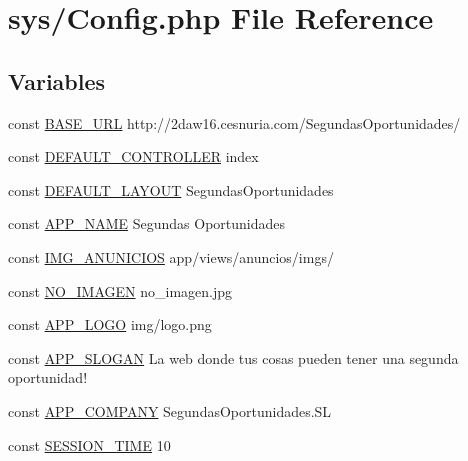 \hypertarget{_config_8php}{}\section{sys/\+Config.php File Reference}
\label{_config_8php}
\subsection*{Variables}
\begin{DoxyCompactItemize}
\item 
const \hyperlink{_config_8php_ac2f7c46cdf071163a82cb95295eca57f}{B\+A\+S\+E\+\_\+\+U\+R\+L} \textquotesingle{}http\+://2daw16.\+cesnuria.\+com/\+Segundas\+Oportunidades/\textquotesingle{}
\item 
const \hyperlink{_config_8php_ae05204cd87e8b77b35a92c595e4d897a}{D\+E\+F\+A\+U\+L\+T\+\_\+\+C\+O\+N\+T\+R\+O\+L\+L\+E\+R} \textquotesingle{}index\textquotesingle{}
\item 
const \hyperlink{_config_8php_a2a1a79da0bc551583b2718abfed84c1d}{D\+E\+F\+A\+U\+L\+T\+\_\+\+L\+A\+Y\+O\+U\+T} \textquotesingle{}Segundas\+Oportunidades\textquotesingle{}
\item 
const \hyperlink{_config_8php_aec1351293f88691205169becf08d525d}{A\+P\+P\+\_\+\+N\+A\+M\+E} \textquotesingle{}Segundas Oportunidades\textquotesingle{}
\item 
const \hyperlink{_config_8php_a669c89cea3882b811ec20c68e14053a9}{I\+M\+G\+\_\+\+A\+N\+U\+N\+I\+C\+I\+O\+S} \textquotesingle{}app/views/anuncios/imgs/\textquotesingle{}
\item 
const \hyperlink{_config_8php_a26f7146c1280c098e322f6285fba78d2}{N\+O\+\_\+\+I\+M\+A\+G\+E\+N} \textquotesingle{}no\+\_\+imagen.\+jpg\textquotesingle{}
\item 
const \hyperlink{_config_8php_a6258d495ac54e2ef923ec328f09693a6}{A\+P\+P\+\_\+\+L\+O\+G\+O} \textquotesingle{}img/logo.\+png\textquotesingle{}
\item 
const \hyperlink{_config_8php_ab4ed970440bc54e9b4f4c4533b32ed7f}{A\+P\+P\+\_\+\+S\+L\+O\+G\+A\+N} \textquotesingle{}La web donde tus cosas pueden tener una segunda oportunidad!\textquotesingle{}
\item 
const \hyperlink{_config_8php_a3a9898264231492488c0204d4716e94d}{A\+P\+P\+\_\+\+C\+O\+M\+P\+A\+N\+Y} \textquotesingle{}Segundas\+Oportunidades.\+S\+L\textquotesingle{}
\item 
const \hyperlink{_config_8php_a7a117a7005f451700303761ecfb3e667}{S\+E\+S\+S\+I\+O\+N\+\_\+\+T\+I\+M\+E} 10

\end{DoxyCompactItemize}
